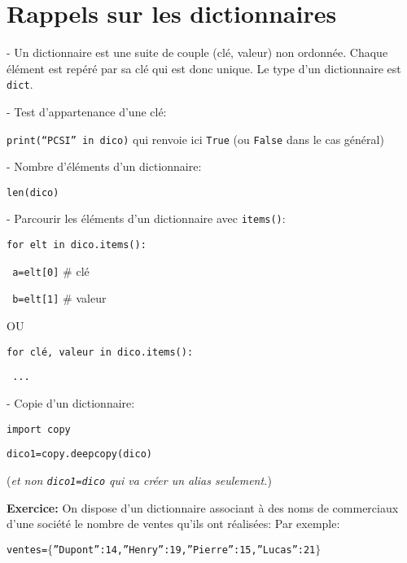 \section*{Rappels sur les dictionnaires}

- Un dictionnaire est une suite de couple (clé, valeur) non ordonnée. Chaque élément est repéré par sa clé qui est donc unique. Le type d'un dictionnaire est \texttt{dict}.

%
%
%
%
%
%
%
%
%
%

 - Test d'appartenance d'une clé:

\texttt{print(“PCSI” in dico)} qui renvoie ici \texttt{True} (ou \texttt{False} dans le cas général)

- Nombre d'éléments d'un dictionnaire:

\texttt{len(dico)}

- Parcourir les éléments d'un dictionnaire avec \texttt{items()}:

\texttt{for elt in dico.items():}

\texttt{\ \qquad  a=elt[0]}  \# clé

\texttt{\ \qquad  b=elt[1]}   \# valeur

OU

\texttt{for clé, valeur in dico.items():}	

\texttt{\ \qquad  ...}

- Copie d'un dictionnaire:

\texttt{import copy}

\texttt{dico1=copy.deepcopy(dico)}	

(\textit{et non \texttt{dico1=dico} qui va créer un alias seulement.})


\bigskip

\textbf{Exercice:} On dispose d'un dictionnaire associant à des noms de commerciaux d'une société le nombre de ventes qu'ils ont réalisées:
Par exemple:

\texttt{ventes=$\{$”Dupont”:14,”Henry”:19,”Pierre”:15,”Lucas”:21$\}$}



